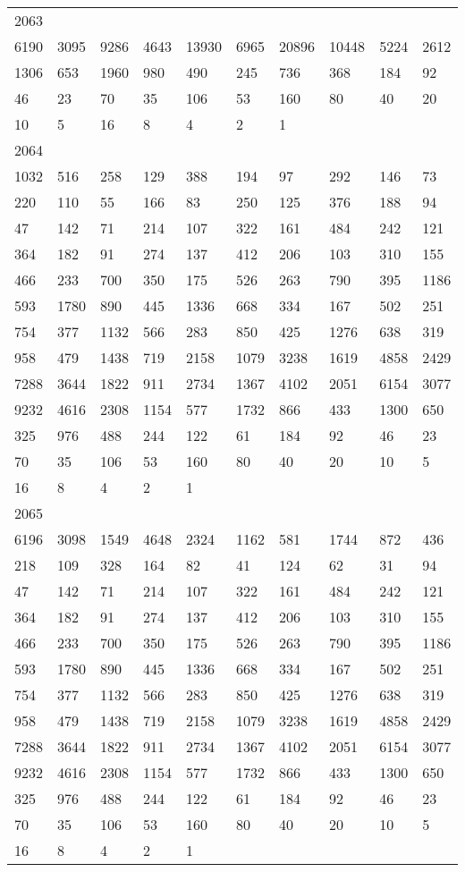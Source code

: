 \begin{longtable}{*{10}{l}}
2063&&&&&&&&&\\
6190& 3095& 9286& 4643& 13930& 6965& 20896& 10448& 5224& 2612\\
1306& 653& 1960& 980& 490& 245& 736& 368& 184& 92\\
46& 23& 70& 35& 106& 53& 160& 80& 40& 20\\
10& 5& 16& 8& 4& 2& 1& \\

2064&&&&&&&&&\\
1032& 516& 258& 129& 388& 194& 97& 292& 146& 73\\
220& 110& 55& 166& 83& 250& 125& 376& 188& 94\\
47& 142& 71& 214& 107& 322& 161& 484& 242& 121\\
364& 182& 91& 274& 137& 412& 206& 103& 310& 155\\
466& 233& 700& 350& 175& 526& 263& 790& 395& 1186\\
593& 1780& 890& 445& 1336& 668& 334& 167& 502& 251\\
754& 377& 1132& 566& 283& 850& 425& 1276& 638& 319\\
958& 479& 1438& 719& 2158& 1079& 3238& 1619& 4858& 2429\\
7288& 3644& 1822& 911& 2734& 1367& 4102& 2051& 6154& 3077\\
9232& 4616& 2308& 1154& 577& 1732& 866& 433& 1300& 650\\
325& 976& 488& 244& 122& 61& 184& 92& 46& 23\\
70& 35& 106& 53& 160& 80& 40& 20& 10& 5\\
16& 8& 4& 2& 1& \\

2065&&&&&&&&&\\
6196& 3098& 1549& 4648& 2324& 1162& 581& 1744& 872& 436\\
218& 109& 328& 164& 82& 41& 124& 62& 31& 94\\
47& 142& 71& 214& 107& 322& 161& 484& 242& 121\\
364& 182& 91& 274& 137& 412& 206& 103& 310& 155\\
466& 233& 700& 350& 175& 526& 263& 790& 395& 1186\\
593& 1780& 890& 445& 1336& 668& 334& 167& 502& 251\\
754& 377& 1132& 566& 283& 850& 425& 1276& 638& 319\\
958& 479& 1438& 719& 2158& 1079& 3238& 1619& 4858& 2429\\
7288& 3644& 1822& 911& 2734& 1367& 4102& 2051& 6154& 3077\\
9232& 4616& 2308& 1154& 577& 1732& 866& 433& 1300& 650\\
325& 976& 488& 244& 122& 61& 184& 92& 46& 23\\
70& 35& 106& 53& 160& 80& 40& 20& 10& 5\\
16& 8& 4& 2& 1& \\


\end{longtable}
